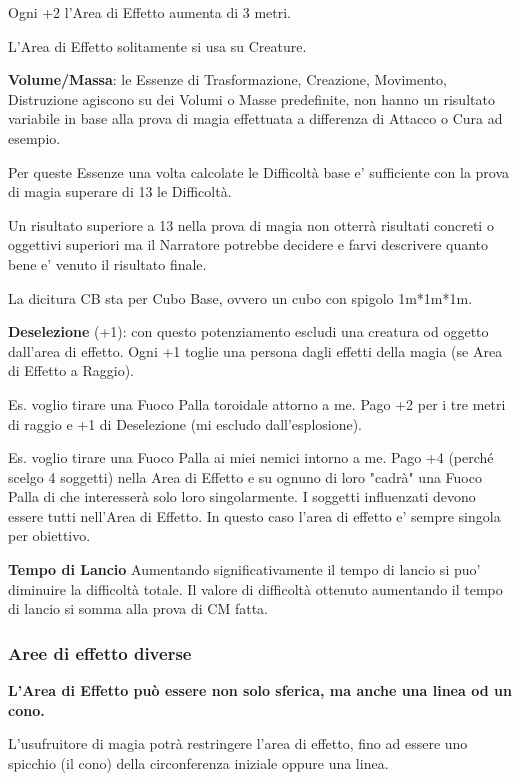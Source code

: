 \documentclass[a4paper,10 pt,twoside,openany]{book}
\begin{document}
Ogni +2 l'Area di Effetto aumenta di 3 metri.

L'Area di Effetto solitamente si usa su Creature.

\textbf{Volume/Massa}: le Essenze di Trasformazione, Creazione, Movimento, Distruzione agiscono su dei Volumi o Masse predefinite, non hanno un risultato variabile in base alla prova di magia effettuata a differenza di Attacco o Cura ad esempio.

Per queste Essenze una volta calcolate le Difficoltà base e' sufficiente con la prova di magia superare di 13 le Difficoltà.

Un risultato superiore a 13 nella prova di magia non otterrà risultati concreti o oggettivi superiori ma il Narratore potrebbe decidere e farvi descrivere quanto bene e' venuto il risultato finale.

La dicitura CB sta per Cubo Base, ovvero un cubo con spigolo 1m*1m*1m.

\textbf{Deselezione} (+1): con questo potenziamento escludi una creatura od oggetto dall'area di  effetto. Ogni +1 toglie una persona dagli effetti della magia (se Area di Effetto a Raggio).

Es. voglio tirare una Fuoco Palla toroidale attorno a me. Pago +2 per i tre metri di raggio e +1 di Deselezione (mi escludo dall'esplosione).

Es. voglio tirare una Fuoco Palla ai miei nemici intorno a me. Pago +4 (perché scelgo 4 soggetti) nella Area di Effetto e su ognuno di loro "cadrà" una Fuoco Palla di che interesserà solo loro singolarmente. I soggetti influenzati devono essere tutti nell'Area di Effetto. In questo caso l'area di effetto e' sempre singola per obiettivo.


\textbf{Tempo di Lancio}  
Aumentando significativamente il tempo di lancio  si puo' diminuire la difficoltà totale.
Il valore di difficoltà ottenuto aumentando il tempo di lancio si somma alla prova di CM fatta.

\subsubsection{Aree di effetto diverse}

\label{aree-di-effetto-diverse}

\textbf{L'Area di Effetto può essere non solo sferica, ma anche una linea od un cono.}

L'usufruitore di magia potrà restringere l'area di effetto, fino ad essere uno spicchio (il cono) della circonferenza iniziale oppure una linea.
\end{document}

